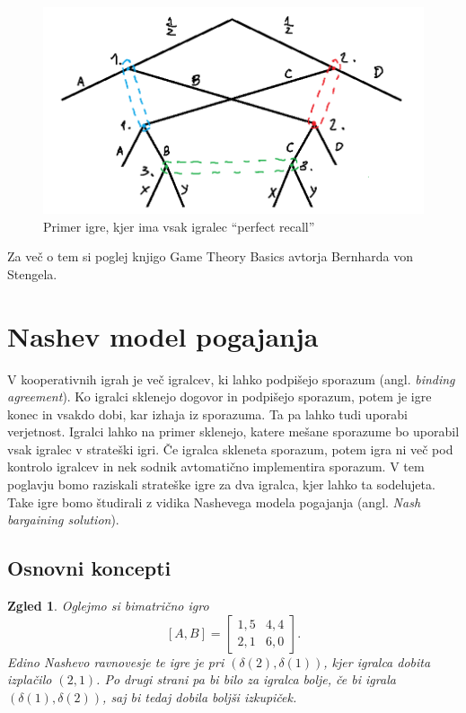 \documentclass[10pt, a4paper]{article}
\newtheorem{zgled}[izr]{Zgled}
\begin{document}
\begin{figure}[hbt!]
  \centering
  \includegraphics[scale=0.7]{drevo_9.png}
  \caption{Primer igre, kjer ima vsak igralec "`perfect recall"'}
\end{figure}

Za več o tem si poglej knjigo Game Theory Basics avtorja Bernharda von Stengela.

\section{Nashev model pogajanja}

V kooperativnih igrah je več igralcev, ki lahko podpišejo sporazum 
(angl. \emph{binding agreement}).
Ko igralci sklenejo dogovor in podpišejo sporazum, potem je igre konec in vsakdo dobi,
kar izhaja iz sporazuma. Ta pa lahko tudi uporabi verjetnost.
Igralci lahko na primer sklenejo, katere mešane sporazume bo uporabil vsak igralec v strateški igri.
Če igralca skleneta sporazum, potem igra ni več pod kontrolo igralcev in nek sodnik 
avtomatično implementira sporazum. V tem poglavju bomo raziskali 
strateške igre za dva igralca, kjer lahko ta sodelujeta.
Take igre bomo študirali z vidika Nashevega modela pogajanja (angl. \emph{Nash bargaining solution}).

\subsection{Osnovni koncepti}

\begin{zgled}\label{zgl:1}
  Oglejmo si bimatrično igro 
$$[A, B] = \begin{bmatrix}
  1,5 & 4,4\\
  2,1 & 6,0
\end{bmatrix}.$$
Edino Nashevo ravnovesje te igre je pri $(\delta(2), \delta(1))$,
kjer igralca dobita izplačilo $(2, 1)$. Po drugi strani pa bi bilo za igralca bolje,
če bi igrala $(\delta(1), \delta(2))$, saj bi tedaj dobila boljši izkupiček.
\end{zgled}
\end{document}
